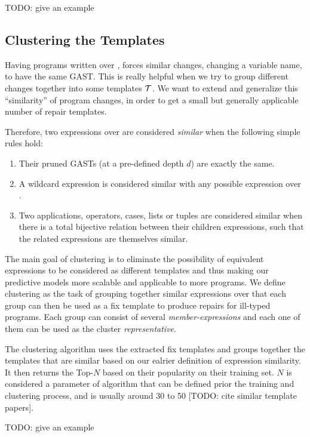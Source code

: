 TODO: give an example


\subsection{Clustering the Templates}
\label{subsec:clustering}

Having programs written over \repairLang, forces similar changes, \ie changing a
variable name, to have the same GAST. This is really helpful when we try to
group different changes together into some templates $\mathcal{T}$. We want to extend and
generalize this ``similarity'' of program changes, in order to get a small but
generally applicable number of repair templates.

Therefore, two expressions over \repairLang are considered \emph{similar} when
the following simple rules hold:
\begin{enumerate}
    \item Their pruned GASTs (at a pre-defined depth $d$) are exactly the same.
    \item A wildcard expression is considered similar with any possible
    expression over \repairLang.
    \item Two applications, operators, cases, lists or tuples are considered
    similar when there is a total bijective relation between their children
    expressions, such that the related expressions are themselves similar.
\end{enumerate}


The main goal of clustering is to eliminate the possibility of equivalent
expressions to be considered as different templates and thus making our
predictive models more scalable and applicable to more programs. We define
clustering as the task of grouping together similar expressions over \repairLang
that each group can then be used as a fix template to produce repairs for
ill-typed programs. Each group can consist of several \emph{member-expressions}
and each one of them can be used as the cluster \emph{representative}.

The clustering algorithm uses the extracted fix templates and groups together
the templates that are similar based on our ealrier definition of expression
similarity. It then returns the Top-$N$ based on their popularity on their
training set. $N$ is considered a parameter of algorithm that can be defined
prior the training and clustering process, and is usually around 30 to 50 [TODO:
cite similar template papers].

TODO: give an example
